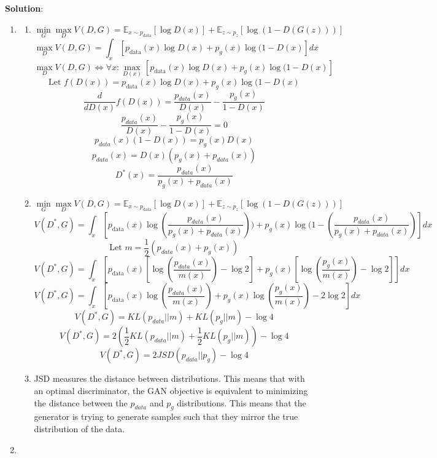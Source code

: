 \documentclass[submit]{../harvardml}
\newenvironment{solution}{%
    \vspace{2mm}\color{blue}\noindent\textbf{Solution}:\ }
{}
\begin{document}
\begin{solution}
	\begin{enumerate}
	    \item 
            \begin{enumerate}
                \item   
                    $$\min_G \max_D V(D,G) = \mathbb E_{x\sim p_{\mathrm{data}}}[\log D(x)] + \mathbb E_{z\sim p_z}[\log(1-D(G(z)))]$$
                    $$\max_D V(D,G) = \int_x [p_{\mathrm{data}}(x)\log D(x) + p_g(x)\log(1-D(x) ]dx$$
                    $$\max_D V(D,G) \iff \forall x: \max_{D(x)} [p_{\mathrm{data}}(x)\log D(x) + p_g(x)\log(1-D(x)]$$
                    $$\text{Let }f(D(x)) = p_{\mathrm{data}}(x)\log D(x) + p_g(x)\log(1-D(x)$$
                    $$\frac{d}{dD(x)}f(D(x)) = \frac{p_{data}(x)}{D(x)} - \frac{p_g(x)}{1 - D(x)}$$
                    $$\frac{p_{data}(x)}{D(x)} - \frac{p_g(x)}{1 - D(x)} = 0$$
                    $$p_{data}(x)(1 - D(x)) = p_g(x)D(x)$$
                    $$p_{data}(x) = D(x)(p_g(x) + p_{data}(x))$$
                    $$ D^*(x) = \frac{p_{data}(x)}{p_g(x) + p_{data}(x)}$$
                \item
                    $$\min_G \max_D V(D,G) = \mathbb E_{x\sim p_{\mathrm{data}}}[\log D(x)] + \mathbb E_{z\sim p_z}[\log(1-D(G(z)))]$$
                    $$V(D^*,G) = \int_x [p_{\mathrm{data}}(x)\log (\frac{p_{data}(x)}{p_g(x) + p_{data}(x)})) + p_g(x)\log(1-(\frac{p_{data}(x)}{p_g(x) + p_{data}(x)}) ]dx$$
                    $$\text{Let }m = \frac{1}{2}(p_{data}(x) + p_g(x))$$
                    $$V(D^*,G) = \int_x [p_{\mathrm{data}}(x)[\log (\frac{p_{data}(x)}{m(x)})-\log2] + p_g(x)[\log(\frac{p_{g}(x)}{m(x)}) - \log2]]dx$$
                    $$V(D^*,G) = \int_x [p_{\mathrm{data}}(x)\log (\frac{p_{data}(x)}{m(x)}) + p_g(x)\log(\frac{p_{g}(x)}{m(x)}) - 2\log 2]dx$$
                    $$V(D^*,G) = KL(p_{data}||m)+KL(p_g||m)- \log 4$$
                    $$V(D^*,G) = 2(\frac{1}{2}KL(p_{data}||m)+\frac{1}{2}KL(p_g||m))- \log 4$$
                    $$V(D^*,G) = 2 JSD(p_{data}||p_g)- \log 4$$
                \item
                    JSD measures the distance between distributions. This means that with an optimal discriminator, the GAN objective is equivalent to minimizing the distance between the $p_{data}$ and $p_g$ distributions. This means that the generator is trying to generate samples such that they mirror the true distribution of the data.
            \end{enumerate}
        \item

\end{enumerate}
\end{solution}
\end{document}
